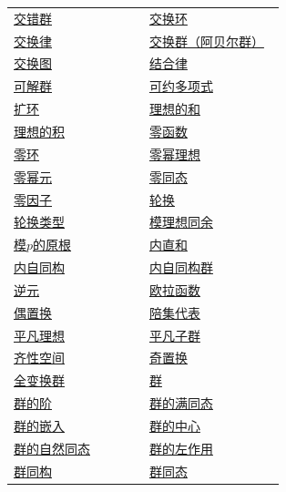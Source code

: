 \begin{longtable}{@{}>{\raggedright\arraybackslash}p{0.47\linewidth}>{\raggedright\arraybackslash}p{0.47\linewidth}@{}}
\hyperref[p2:concept:c1-l290]{交错群} & \hyperref[p2:concept:c1-l958]{交换环}\\
\hyperref[p2:concept:c1-l37]{交换律} & \hyperref[p2:concept:c1-l60]{交换群（阿贝尔群）}\\
\hyperref[p2:concept:c1-l762]{交换图} & \hyperref[p2:concept:c1-l34]{结合律}\\
\hyperref[p2:concept:c2-l522]{可解群} & \hyperref[p2:concept:c3-irreducible]{可约多项式}\\
\hyperref[p2:concept:c3-extension-ring]{扩环} & \hyperref[p2:concept:c3-subring-sum]{理想的和}\\
\hyperref[p2:concept:c3-ideal-product]{理想的积} & \hyperref[p2:concept:c3-zero-function]{零函数}\\
\hyperref[p2:concept:c1-l1261]{零环} & \hyperref[p2:concept:c3-nilpotent-ideal]{零幂理想}\\
\hyperref[p2:concept:c3-nilpotent]{零幂元} & \hyperref[p2:concept:c1-l1157]{零同态}\\
\hyperref[p2:concept:c1-l989]{零因子} & \hyperref[p2:concept:c1-l209]{轮换}\\
\hyperref[p2:concept:c2-l372]{轮换类型} & \hyperref[p2:concept:c3-congruence]{模理想同余}\\
\hyperref[p2:concept:c3-primitive-root]{模$p$的原根} & \hyperref[p2:concept:c2-l1542]{内直和}\\
\hyperref[p2:concept:c2-l790]{内自同构} & \hyperref[p2:concept:c2-l799]{内自同构群}\\
\hyperref[p2:concept:c1-l42]{逆元} & \hyperref[p2:concept:c1-l1356]{欧拉函数}\\
\hyperref[p2:concept:c1-l289]{偶置换} & \hyperref[p2:concept:c1-l312]{陪集代表}\\
\hyperref[p2:concept:c1-l1203]{平凡理想} & \hyperref[p2:concept:c1-l252]{平凡子群}\\
\hyperref[p2:concept:c2-l986]{齐性空间} & \hyperref[p2:concept:c1-l289]{奇置换}\\
\hyperref[p2:concept:c1-l192]{全变换群} & \hyperref[p2:concept:c1-l52]{群}\\
\hyperref[p2:concept:c1-l149]{群的阶} & \hyperref[p2:concept:c1-l487]{群的满同态}\\
\hyperref[p2:concept:c1-l487]{群的嵌入} & \hyperref[p2:concept:c2-l808]{群的中心}\\
\hyperref[p2:concept:c1-l727]{群的自然同态} & \hyperref[p2:concept:c2-l924]{群的左作用}\\
\hyperref[p2:concept:c1-l388]{群同构} & \hyperref[p2:concept:c1-l482]{群同态}\\

\end{longtable}
